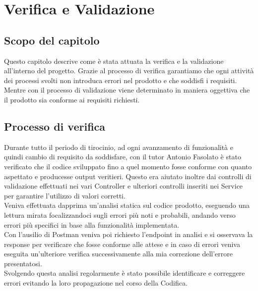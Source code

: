 \chapter{Verifica e Validazione}
\label{cap:verifica-validazione}
\section{Scopo del capitolo}
Questo capitolo descrive come è stata attuata la verifica e la validazione all'interno del progetto. Grazie al processo di verifica garantiamo che ogni attività dei processi svolti non introduca errori nel prodotto e che soddisfi i requisiti. Mentre con il processo di validazione viene determinato in maniera oggettiva che il prodotto sia conforme ai requisiti richiesti.
\section{Processo di verifica}
Durante tutto il periodo di tirocinio, ad ogni avanzamento di funzionalità e quindi cambio di requisito da soddisfare, con il tutor Antonio Fasolato è stato verificato che il codice sviluppato fino a quel momento fosse conforme con quanto aspettato e producesse output veritieri. Questo era aiutato inoltre dai controlli di validazione effettuati nei vari Controller e ulteriori controlli inseriti nei Service per garantire l’utilizzo di valori corretti.\\
Veniva effettuata dapprima un’analisi statica sul codice prodotto, eseguendo una lettura mirata focalizzandoci sugli errori più noti e probabili, andando verso errori più specifici in base alla funzionalità implementata.\\
Con l'ausilio di Postman veniva poi richiesto l'endpoint in analisi e si osservava la response per verificare che fosse conforme alle attese e in caso di errori veniva eseguita un’ulteriore verifica successivamente alla mia correzione dell’errore presentatosi.\\
Svolgendo questa analisi regolarmente è stato possibile identificare e correggere errori evitando la loro propagazione nel corso della Codifica.

